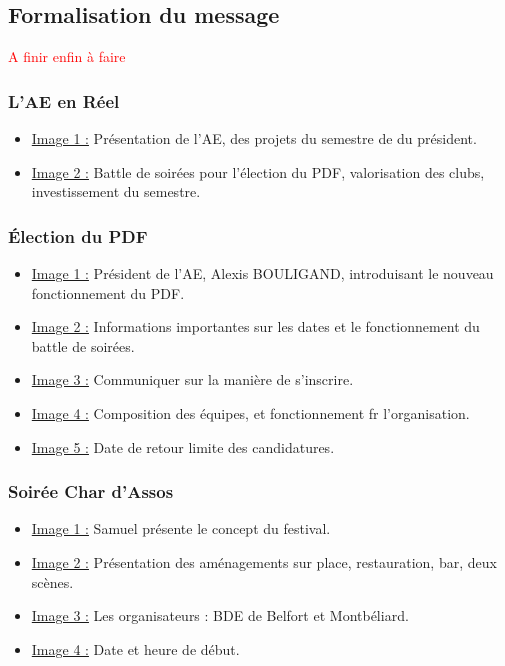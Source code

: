 
\subsection{Formalisation du message}\label{subsec:formalisation-du-message}

\textcolor{red}{A finir enfin à faire}

\subsubsection{L'AE en Réel}
\begin{itemize}
    \item \underline{Image 1 :} Présentation de l'\gls{AE}, des projets du semestre de du président.
    \item \underline{Image 2 :} Battle de soirées pour l'élection du PDF, valorisation des clubs, investissement du semestre.
\end{itemize}

\subsubsection{Élection du PDF}
\begin{itemize}
    \item \underline{Image 1 :} Président de l'AE, Alexis BOULIGAND, introduisant le nouveau fonctionnement du PDF.
    \item \underline{Image 2 :} Informations importantes sur les dates et le fonctionnement du battle de soirées.
    \item \underline{Image 3 :} Communiquer sur la manière de s'inscrire.
    \item \underline{Image 4 :} Composition des équipes, et fonctionnement fr l'organisation.
    \item \underline{Image 5 :} Date de retour limite des candidatures.
\end{itemize}

\subsubsection{Soirée Char d’Assos}
\begin{itemize}
    \item \underline{Image 1 :} Samuel présente le concept du festival.
    \item \underline{Image 2 :} Présentation des aménagements sur place, restauration, bar, deux scènes.
    \item \underline{Image 3 :} Les organisateurs : BDE de Belfort et Montbéliard.
    \item \underline{Image 4 :} Date et heure de début.
\end{itemize}


